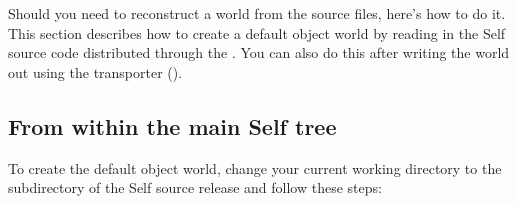 \documentclass[letterpaper,10pt,english]{sphinxmanual}
\begin{document}
Should you need to reconstruct a world from the source files, here’s how to do it. This section describes
how to create a default object world by reading in the Self source code distributed through the . You can also do this after writing the world out using the transporter ().


\subsection{From within the main Self tree}
\label{\detokenize{buildworld:github-repository}}\label{\detokenize{buildworld:from-within-the-main-self-tree}}
To create the default object world, change your current working directory to the  subdirectory of the Self source release and follow these steps:
\end{document}
